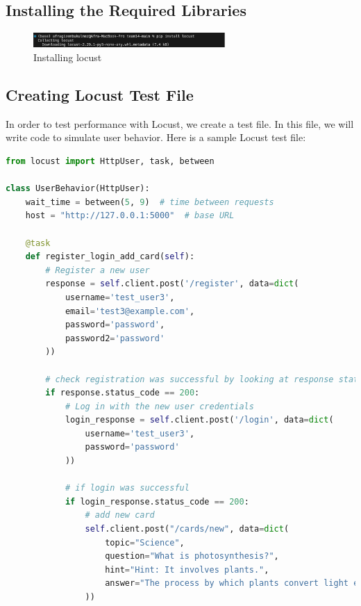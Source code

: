 \subsection{Installing the Required Libraries}

            \begin{figure}[H]
                \centering
                \includegraphics[width=0.65\textwidth]{image.png}
                \caption{Installing locust}
                \label{fig:InstallingLocust}
            \end{figure}

\subsection{Creating Locust Test File}
In order to test performance with Locust, we create a test file. In this file, we will write code to simulate user behavior. Here is a sample Locust test file:

\begin{lstlisting}[language=Python]
from locust import HttpUser, task, between

class UserBehavior(HttpUser):
    wait_time = between(5, 9)  # time between requests
    host = "http://127.0.0.1:5000"  # base URL

    @task
    def register_login_add_card(self):
        # Register a new user
        response = self.client.post('/register', data=dict(
            username='test_user3',
            email='test3@example.com',
            password='password',
            password2='password'
        ))

        # check registration was successful by looking at response status
        if response.status_code == 200:
            # Log in with the new user credentials
            login_response = self.client.post('/login', data=dict(
                username='test_user3',
                password='password'
            ))

            # if login was successful
            if login_response.status_code == 200:
                # add new card
                self.client.post("/cards/new", data=dict(
                    topic="Science",
                    question="What is photosynthesis?",
                    hint="Hint: It involves plants.",
                    answer="The process by which plants convert light energy into chemical energy."
                ))


\end{lstlisting}\newpage



